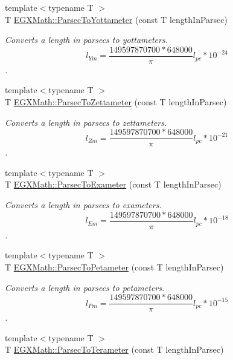 \begin{DoxyCompactItemize}
{\footnotesize template$<$typename T $>$ }\\T \mbox{\hyperlink{group___e_g_x_math-_conversions-_length_conversions-_astronomical-_parsec-_s_i_ga8a5381e5fcaa36d464b5bdf17e238ef2}{E\+G\+X\+Math\+::\+Parsec\+To\+Yottameter}} (const T length\+In\+Parsec)
\begin{DoxyCompactList}\small\item\em Converts a length in parsecs to yottameters. \[ l_{Ym}=\frac{149597870700 * 648000}{\pi}l_{pc} * 10^{-24} \]. \end{DoxyCompactList}\item 
{\footnotesize template$<$typename T $>$ }\\T \mbox{\hyperlink{group___e_g_x_math-_conversions-_length_conversions-_astronomical-_parsec-_s_i_gad7d13308de04663badf7e5ea4021b43f}{E\+G\+X\+Math\+::\+Parsec\+To\+Zettameter}} (const T length\+In\+Parsec)
\begin{DoxyCompactList}\small\item\em Converts a length in parsecs to zettameters. \[ l_{Zm}=\frac{149597870700 * 648000}{\pi}l_{pc} * 10^{-21} \]. \end{DoxyCompactList}\item 
{\footnotesize template$<$typename T $>$ }\\T \mbox{\hyperlink{group___e_g_x_math-_conversions-_length_conversions-_astronomical-_parsec-_s_i_ga598f46c20868c84cf76fd6f934620728}{E\+G\+X\+Math\+::\+Parsec\+To\+Exameter}} (const T length\+In\+Parsec)
\begin{DoxyCompactList}\small\item\em Converts a length in parsecs to exameters. \[ l_{Em}=\frac{149597870700 * 648000}{\pi}l_{pc} * 10^{-18} \]. \end{DoxyCompactList}\item 
{\footnotesize template$<$typename T $>$ }\\T \mbox{\hyperlink{group___e_g_x_math-_conversions-_length_conversions-_astronomical-_parsec-_s_i_ga9902983ed9563d247c8701370a95eb55}{E\+G\+X\+Math\+::\+Parsec\+To\+Petameter}} (const T length\+In\+Parsec)
\begin{DoxyCompactList}\small\item\em Converts a length in parsecs to petameters. \[ l_{Pm}=\frac{149597870700 * 648000}{\pi}l_{pc} * 10^{-15} \]. \end{DoxyCompactList}\item 
{\footnotesize template$<$typename T $>$ }\\T \mbox{\hyperlink{group___e_g_x_math-_conversions-_length_conversions-_astronomical-_parsec-_s_i_gafa04d007102c3b440653c9c0460b0cd8}{E\+G\+X\+Math\+::\+Parsec\+To\+Terameter}} (const T length\+In\+Parsec)

\end{DoxyCompactItemize}
